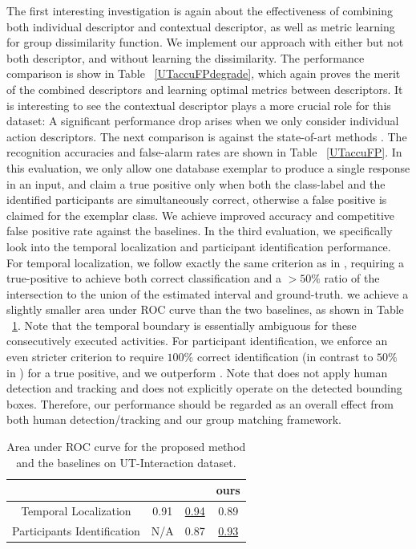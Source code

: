 The first interesting investigation is again about the effectiveness of combining both individual descriptor and contextual descriptor, as well as metric learning for group dissimilarity function. We implement our approach with either but not both descriptor, and without learning the dissimilarity. The performance comparison is show in Table ~\ref{UTaccuFPdegrade}, which again proves the merit of the combined descriptors and learning optimal metrics between descriptors. It is interesting to see the contextual descriptor plays a more crucial role for this dataset: A significant performance drop arises when we only consider individual action descriptors. The next comparison is against the state-of-art methods \cite{Ryoo:group,Amer:group}. The recognition accuracies and false-alarm rates are shown in Table ~\ref{UTaccuFP}. In this evaluation, we only allow one database exemplar to produce a single response in an input, and claim a true positive only when both the class-label and the identified participants are simultaneously correct, otherwise a false positive is claimed for the exemplar class. We achieve improved accuracy and competitive false positive rate against the baselines. In the third evaluation, we specifically look into the temporal localization and participant identification performance. For temporal localization, we follow exactly the same criterion as in \cite{Amer:group}, requiring a true-positive to achieve both correct classification and a $>50\%$ ratio of the intersection to the union of the estimated interval and ground-truth. we achieve a slightly smaller area under ROC curve than the two baselines, as shown in Table ~\ref{UTarea}. Note that the temporal boundary is essentially ambiguous for these consecutively executed activities. For participant identification, we enforce an even stricter criterion to require $100\%$ correct identification (in contrast to $50\%$ in \cite{Amer:group}) for a true positive, and we outperform \cite{Amer:group}. Note that \cite{Ryoo:group} does not apply human detection and tracking and \cite{Amer:group} does not explicitly operate on the detected bounding boxes. Therefore, our performance should be regarded as an overall effect from both human detection/tracking and our group matching framework.

\begin{table}[ht]
\centering \caption{Area under ROC curve for the proposed method and the baselines on UT-Interaction dataset.}
\footnotesize{
\begin{tabular}{|c|c|c|c|}
\hline   & \cite{Ryoo:group} &  \cite{Amer:group}  &   ours \\
\hline Temporal Localization &  0.91 & \underline{0.94} &  0.89\\
\hline Participants Identification &  N/A & 0.87 &  \underline{0.93}   \\
\hline 
\end{tabular}
}
\label{UTarea}
\end{table}

